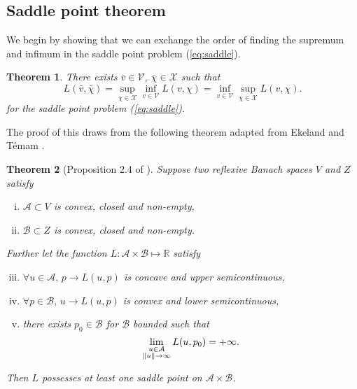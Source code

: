 \documentclass[11pt]{article}
\newtheorem{theorem}{Theorem}[section]
\begin{document}
\subsection{Saddle point theorem} \label{sec:saddle}
We begin by showing that we can exchange the order of finding the supremum and infimum in the saddle point problem (\ref{eq:saddle}).
\begin{theorem} \label{th:exchange}
There exists $\bar{v} \in {\mathcal V}$, $\bar{\chi} \in {\mathcal{X}}$ such that 
$$L(\bar{v},\bar{\chi})=\sup_{\chi\in \mathcal{X}}\inf_{v\in \mathcal{V}}L(v,\chi)=\inf_{v\in \mathcal{V}}\sup_{\chi\in \mathcal{X}}L(v,\chi).$$
for the saddle point problem (\ref{eq:saddle}).
\end{theorem}

The proof of this draws from the following theorem adapted from Ekeland and T\'emam \cite{et}.

\begin{theorem} [Proposition 2.4 of \cite{et}] 
\label{th:et}
Suppose two reflexive Banach spaces $V$ and $Z$ satisfy 
\begin{enumerate}[(i)]
\item $\mathcal{A}\subset V$ is convex, closed and non-empty, 
\item $\mathcal{B}\subset Z$ is convex, closed and non-empty. 
\end{enumerate}
Further let the function $L:\mathcal{A}\times\mathcal{B}\mapsto\mathbb{R}$ satisfy
 \begin{enumerate}[(i)]
  \setcounter{enumi}{2}
\item $\forall u\in\mathcal{A},\,p\rightarrow L(u,p)$ is concave and upper semicontinuous, 
\item $\forall p\in\mathcal{B},\,u\rightarrow L(u,p)$ is convex and lower semicontinuous,
\item there exists $p_0\in\mathcal{B}$ for $\mathcal{B}$ bounded such that 
$$
\lim_{\substack{u\in\mathcal{A}\\ \norm{u}\rightarrow\infty}}L(u,p_0)=+\infty.\\
$$
 \end{enumerate}
Then $L$ possesses at least one saddle point on $\mathcal{A}\times\mathcal{B}$.   
\end{theorem}
\end{document}
